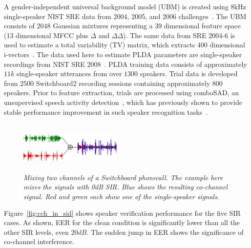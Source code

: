 A gender-independent universal background model (UBM) is created using 8kHz single-speaker NIST SRE data from 2004, 2005, and 2006 challenges~\cite{NIST04,NIST05,NIST06}. 
The UBM consists of $2048$ Gaussian mixtures representing a 39 dimensional feature space (13 dimensional MFCC plus $\Delta$ and $\Delta\Delta$). 
The same data from SRE 2004-6 is used to estimate a total variability (TV) matrix, which extracts $400$ dimensional i-vectors~\cite{Dehak_ivector}. 
The data used here to estimate PLDA parameters are single-speaker recordings from NIST SRE 2008~\cite{NIST08}. 
PLDA training data consists of approximately $11k$ single-speaker utterances from over $1300$ speakers. 
Trial data is developed from 2500 Switchboard2 recording sessions containing approximately $800$ speakers. 
Prior to feature extraction, trials are processed using comboSAD, an unsupervised speech activity detection~\cite{sadjadi2013unsupervised}, which has previously shown to provide stable performance improvement in such speaker recognition tasks~\cite{hasan2013crss}. 

\begin{figure}[t!]
	\vspace{-1mm}
	\hspace{3mm}
	\centering
	\includegraphics[height = 1.0in, width=0.45\textwidth]{chapters/cochannelplda_jp/IEEEtran/figures/swb_cch_demo-crop}
	\vspace{-1mm}
	\caption{\it \small Mixing two channels of a Switchboard phonecall. The example here mixes the signals with 0dB SIR. Blue shows the resulting co-channel signal. Red and green each show one of the single-speaker signals.}
	\label{fig:mix_swb}
	\vspace{-1mm}
\end{figure}

Figure~\ref{fig:cch_in_sid} shows speaker verification performance for the five SIR cases. 
As shown, EER for the clean condition is significantly lower than all the other SIR levels, even $20dB$. 
The sudden jump in EER shows the significance of co-channel interference. 

